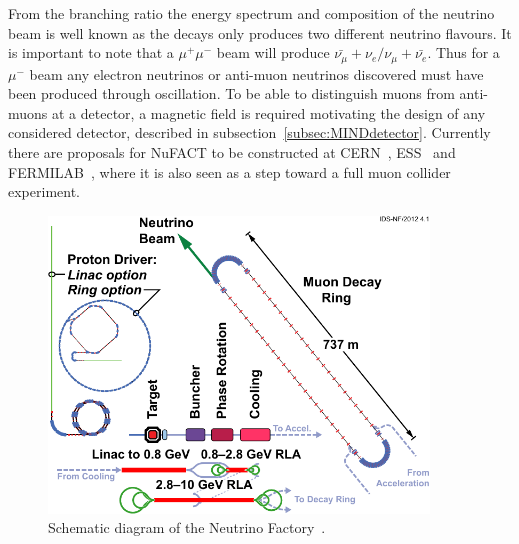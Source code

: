 From the branching ratio the energy spectrum and composition of the neutrino beam is well known as the decays only produces two different neutrino flavours. It is important to note that a $\mu^+\mu^-$ beam will produce $\bar{\nu_\mu} + \nu_e / \nu_{\mu} + \bar{\nu_e}$. Thus for a $\mu^-$ beam any electron neutrinos or anti-muon neutrinos discovered must have been produced through oscillation. To be able to distinguish muons from anti-muons at a detector, a magnetic field is required motivating the design of any considered detector, described in subsection~\ref{subsec:MINDdetector}. Currently there are proposals for NuFACT to be constructed at CERN~\cite{25NUfact}, ESS~\cite{ESS} and FERMILAB~\cite{NuFACTfermi}, where it is also seen as a step toward a full muon collider experiment.

\begin{figure}[h!]
\centering
\includegraphics[width=0.9\textwidth]{figures/131112-IDS-NF.pdf}
\caption{Schematic diagram of the Neutrino Factory~\cite{Fix7}.}
\label{fig:nuFact}
\end{figure}

